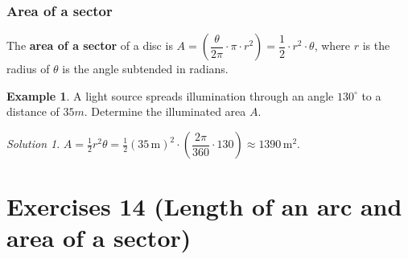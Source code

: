 \documentclass[
  12pt,
  oneside]{book}
\theoremstyle{definition}
\theoremstyle{definition}
\newtheorem{example}{Example}[chapter]
\theoremstyle{definition}
\theoremstyle{definition}
\theoremstyle{remark}
\newtheorem*{solution}{Solution}
\begin{document}
\hypertarget{area-of-a-sector}{%
\subsection{Area of a sector}\label{area-of-a-sector}}

The \textbf{area of a sector} of a disc is \(A=\left(\dfrac{\theta}{2\pi}\cdot\pi\cdot r^2\right) = \dfrac{1}{2}\cdot r^2\cdot \theta\), where \(r\) is the radius of \(\theta\) is the angle subtended in radians.

\begin{example}
A light source spreads illumination through an angle \(130^\circ\) to a distance of \(35m\). Determine the illuminated area \(A\).
\end{example}

\begin{solution}
\(A=\frac12 r^2\theta = \frac12\left(35\,\mathrm{m}\right)^2\cdot\left(\dfrac{2\pi}{360}\cdot 130\right) \approx 1390\,\mathrm{m}^2\).
\end{solution}

\hypertarget{exercises-14-length-of-an-arc-and-area-of-a-sector}{%
\chapter*{Exercises 14 (Length of an arc and area of a sector)}\label{exercises-14-length-of-an-arc-and-area-of-a-sector}}
\end{document}
